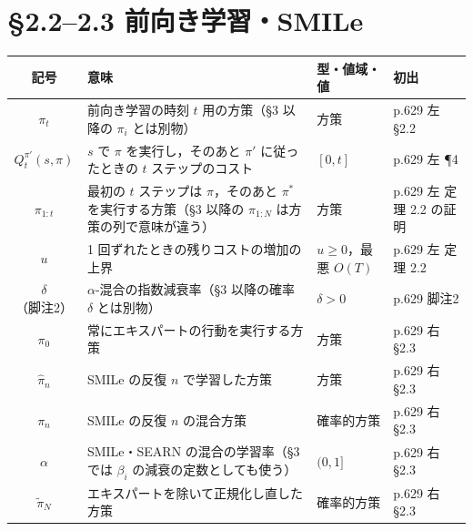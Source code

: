 \documentclass[a4paper,10pt]{ltjsarticle}
\newcommand{\note}[1]{\textcolor{red!70!black}{#1}}
\newenvironment{symtab}{%
  \par\noindent\begin{tabular}{SMTP}
  \toprule
  記号 & 意味 & 型・値域・値 & 初出 \\
  \midrule
}{\bottomrule\end{tabular}\par\medskip}
\begin{document}
\section{§2.2--2.3 前向き学習・SMILe}
\begin{symtab}
$\pi_t$ & 前向き学習の時刻 $t$ 用の方策\note{（§3 以降の $\pi_i$ とは別物）} & 方策 & p.629 左 §2.2 \\
$Q_t^{\pi'}(s,\pi)$ & $s$ で $\pi$ を実行し，そのあと $\pi'$ に従ったときの $t$ ステップのコスト & $[0,t]$ & p.629 左 ¶4 \\
$\pi_{1:t}$ & 最初の $t$ ステップは $\pi$，そのあと $\pi^*$ を実行する方策\note{（§3 以降の $\pi_{1:N}$ は方策の列で意味が違う）} & 方策 & p.629 左 定理 2.2 の証明 \\
$u$ & 1 回ずれたときの残りコストの増加の上界 & $u\ge 0$，最悪 $O(T)$ & p.629 左 定理 2.2 \\
$\delta$（脚注2） & $\alpha$-混合の指数減衰率\note{（§3 以降の確率 $\delta$ とは別物）} & $\delta>0$ & p.629 脚注2 \\
$\pi_0$ & 常にエキスパートの行動を実行する方策 & 方策 & p.629 右 §2.3 \\
$\hat\pi_n$ & SMILe の反復 $n$ で学習した方策 & 方策 & p.629 右 §2.3 \\
$\pi_n$ & SMILe の反復 $n$ の混合方策 & 確率的方策 & p.629 右 §2.3 \\
$\alpha$ & SMILe・SEARN の混合の学習率\note{（§3 では $\beta_i$ の減衰の定数としても使う）} & $(0,1]$ & p.629 右 §2.3 \\
$\tilde\pi_N$ & エキスパートを除いて正規化し直した方策 & 確率的方策 & p.629 右 §2.3 \\
\end{symtab}

\end{document}
